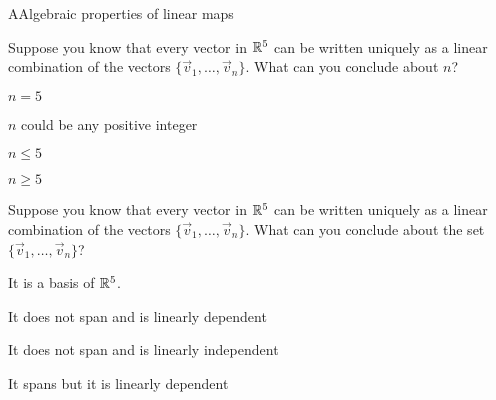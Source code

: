 \documentclass{article}[12pt]
\begin{document}
\begin{module}{A}{Algebraic properties of linear maps}
\begin{readinessAssuranceTest}
  \item Suppose you know that every vector in $\mathbb{R}^5$ can be written uniquely as a linear combination of the vectors $\{\vec{v}_1, \ldots, \vec{v}_n\}$.  What can you conclude about $n$?
  \begin{readinessAssuranceTestChoices}
  \item $n=5$
  \item $n$ could be any positive integer
  \item $n \leq 5$
  \item $n \geq 5$
  \end{readinessAssuranceTestChoices}

  \item Suppose you know that every vector in $\mathbb{R}^5$ can be written uniquely as a linear combination of the vectors $\{\vec{v}_1, \ldots, \vec{v}_n\}$.  What can you conclude about the set $\{\vec{v}_1, \ldots, \vec{v}_n\}$?
  \begin{readinessAssuranceTestChoices}
  \item It is a basis of $\mathbb{R}^5$.
  \item It does not span and is linearly dependent
  \item It does not span and is linearly independent
  \item It spans but it is linearly dependent
  \end{readinessAssuranceTestChoices}

  \end{readinessAssuranceTest}


\end{module}
\end{document}
